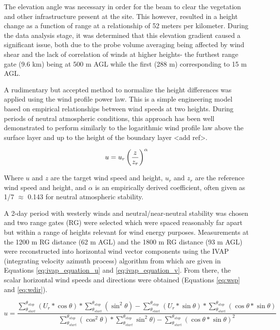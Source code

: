 The elevation angle was necessary in order for the beam to clear the vegetation and other infrastructure present at the site. This however, resulted in a height change as a function of range at a relationship of 52 meters per kilometer. During the data analysis stage, it was determined that this elevation gradient caused a significant issue, both due to the probe volume averaging being affected by wind shear and the lack of correlation of winds at higher heights- the furthest range gate (9.6 km) being at 500 m AGL while the first (288 m) corresponding to 15 m AGL. 

A rudimentary but accepted method to normalize the height differences was applied using the wind profile power law. This is a simple engineering model based on empirical relationships between wind speeds at two heights. During periods of neutral atmospheric conditions, this approach has been well demonstrated to perform similarly to the logarithmic wind profile law above the surface layer and up to the height of the boundary layer <add ref>.

\begin{equation}
    \centering
        u = u_{r} \left( \frac {z} {z_{r}} \right) ^ {\alpha}
    \label{eq:wind_power_law}
\end{equation}

Where $u$ and $z$ are the target wind speed and height, $u_r$ and $z_r$ are the reference wind speed and height, and $\alpha$ is an empirically derived coefficient, often given as 1/7 $\approx$ 0.143 for neutral atmospheric stability.

A 2-day period with westerly winds and neutral/near-neutral stability was chosen and two range gates (RG) were selected which were spaced reasonably far apart but within a range of heights relevant for wind energy purposes. Measurements at the 1200 m RG distance (62 m AGL) and the 1800 m RG distance (93 m AGL) were reconstructed into horizontal wind vector components using the IVAP (integrating velocity azimuth process) algorithm from \cite{liang_ivap_2007} which are given in Equations \ref{eq:ivap_equation_u} and \ref{eq:ivap_equation_v}. From there, the scalar horizontal wind speeds and directions were obtained (Equations \ref{eq:wsp} and \ref{eq:wdir}).

\begin{equation}
    u = \frac{\sum_{\theta_{start}}^{\theta_{stop}} (U_r*\cos \theta ) * \sum_{\theta_{start}}^{\theta_{stop}} (\sin^2 \theta )- \sum_{\theta_{start}}^{\theta_{stop}} (U_r*\sin \theta ) * \sum_{\theta_{start}}^{\theta_{stop}} (\cos \theta  * \sin \theta )}
    {\sum_{\theta_{start}}^{\theta_{stop}} (\cos^2 \theta )*\sum_{\theta_{start}}^{\theta_{stop}} \sin^2 \theta  ) - \sum_{\theta_{start}}^{\theta_{stop}} (\cos \theta  * \sin \theta )^2}
    \label{eq:ivap_equation_u}
\end{equation}

